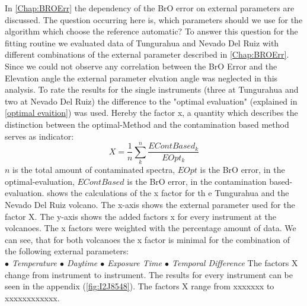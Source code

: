 \documentclass  [
  paper    = a4,
  BCOR     = 10mm,
  twoside,
  fontsize = 12pt,
  fleqn,
  toc      = bibnumbered,
  toc      = listofnumbered,
  numbers  = noendperiod,
  headings = normal,
  listof   = leveldown,
  version  = 3.03
]                                       {scrreprt}
\begin{document}
	In \cref{Chap:BROErr} the dependency of the BrO error on external parameters are discussed. The question occurring here is, which parameters should we use for the algorithm which choose the reference automatic?
	To answer this question for the fitting routine we evaluated data of Tungurahua and Nevado Del Ruiz with different combinations of the external parameter described in \cref{Chap:BROErr}. Since we could not observe any correlation between the BrO Error and the Elevation angle the external parameter elvation angle was neglected in this analysis. To rate the results for the single instruments (three at Tungurahua and two at Nevado Del Ruiz) the difference to the "optimal evaluation" (explained in \ref{optimal evaition}) was used. Hereby the factor x, a quantity which describes the distinction between the optimal-Method and the contamination based method serves as indicator:
	\begin{equation}
	X = \frac{1}{n}\sum_{k}^{n} \frac{EContBased_{ k}}{EOpt_{ k}}
	\end{equation}
	$n$ is the total amount of contaminated spectra, $EOpt$ is the BrO error, in the optimal-evaluation, $EContBased$ is the BrO error, in the contamination based-evaluation. 
	 shows the calculations of the x factor for th e Tungurahua and the Nevado Del Ruiz volcano. The x-axis shows the external parameter used for the factor X. The y-axis shows the added factors x for every instrument at the volcanoes. The x factors were weighted with the percentage amount of data. We can see, that for both volcanoes the x factor is minimal for the combination of the following external parameters:\\
	\textit{$\bullet$ Temperature  $\bullet$ Daytime  $\bullet$ Exposure Time  $\bullet$ Temporal Difference}
	The factors X change from instrument to instrument. The results for every instrument can be seen in the appendix (\cref{fig:I2J8548}). The factors X range from xxxxxxx to xxxxxxxxxxxx.
\end{document}
